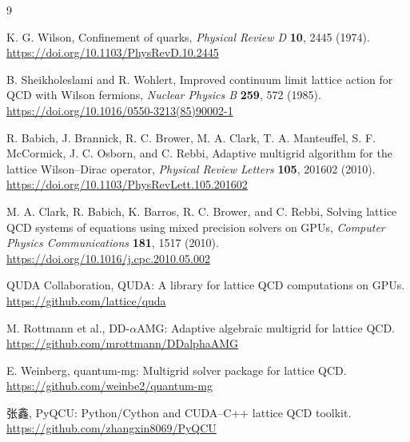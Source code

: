 \documentclass[UTF8,a4paper,11pt,fontset=none]{ctexart}
\numberwithin{equation}{section}
\numberwithin{figure}{section}
\numberwithin{table}{section}
\begin{document}
\begin{thebibliography}{9}

K. G. Wilson,
\newblock Confinement of quarks,
\newblock \emph{Physical Review D} \textbf{10}, 2445 (1974).
\newblock \url{https://doi.org/10.1103/PhysRevD.10.2445}

B. Sheikholeslami and R. Wohlert,
\newblock Improved continuum limit lattice action for QCD with Wilson fermions,
\newblock \emph{Nuclear Physics B} \textbf{259}, 572 (1985).
\newblock \url{https://doi.org/10.1016/0550-3213(85)90002-1}

R. Babich, J. Brannick, R. C. Brower, M. A. Clark,
T. A. Manteuffel, S. F. McCormick, J. C. Osborn, and C. Rebbi,
\newblock Adaptive multigrid algorithm for the lattice Wilson--Dirac operator,
\newblock \emph{Physical Review Letters} \textbf{105}, 201602 (2010).
\newblock \url{https://doi.org/10.1103/PhysRevLett.105.201602}

M. A. Clark, R. Babich, K. Barros, R. C. Brower, and C. Rebbi,
\newblock Solving lattice QCD systems of equations using mixed precision
solvers on GPUs,
\newblock \emph{Computer Physics Communications} \textbf{181}, 1517 (2010).
\newblock \url{https://doi.org/10.1016/j.cpc.2010.05.002}

QUDA Collaboration,
\newblock QUDA: A library for lattice QCD computations on GPUs.
\newblock \url{https://github.com/lattice/quda}

M. Rottmann et al.,
\newblock DD-$\alpha$AMG: Adaptive algebraic multigrid for lattice QCD.
\newblock \url{https://github.com/mrottmann/DDalphaAMG}

E. Weinberg,
\newblock quantum-mg: Multigrid solver package for lattice QCD.
\newblock \url{https://github.com/weinbe2/quantum-mg}

张鑫,
\newblock PyQCU: Python/Cython and CUDA--C++ lattice QCD toolkit.
\newblock \url{https://github.com/zhangxin8069/PyQCU}

\end{thebibliography}
\end{document}
